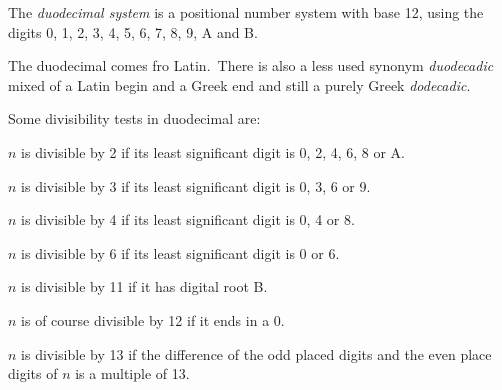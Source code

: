 \documentclass[12pt]{article}
\begin{document}
The {\em duodecimal system} is a positional number system with base 12, using the digits 0, 1, 2, 3, 4, 5, 6, 7, 8, 9, A and B.

The  duodecimal comes fro Latin.\, There is also a less used synonym {\em duodecadic} mixed of a Latin begin and a Greek end and still a purely Greek  {\em dodecadic}.

Some divisibility tests in duodecimal are:

$n$ is divisible by 2 if its least significant digit is 0, 2, 4, 6, 8 or A.

$n$ is divisible by 3 if its least significant digit is 0, 3, 6 or 9.

$n$ is divisible by 4 if its least significant digit is 0, 4 or 8.

$n$ is divisible by 6 if its least significant digit is 0 or 6.

$n$ is divisible by 11 if it has digital root B.

$n$ is of course divisible by 12 if it ends in a 0.

$n$ is divisible by 13 if the difference of the odd placed digits and the even place digits of $n$ is a multiple of 13.
\end{document}
